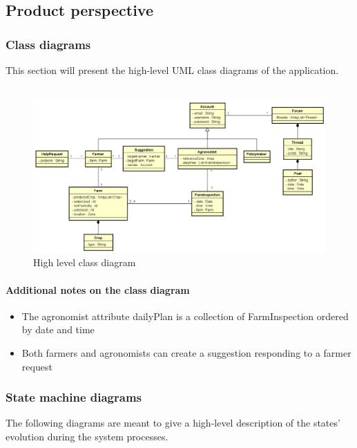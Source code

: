 \subsection{Product perspective}
\subsubsection{Class diagrams}
This section will present the high-level UML class diagrams of the application.
\\\\
\begin{figure}[H]
    \centering
    \includegraphics[width=\textwidth,height=\textheight,keepaspectratio]{Images/HighLevelUMLcut.png}
    \caption{\label{fig:high_level_uml}High level class diagram}
\end{figure}

\bigskip
\paragraph{Additional notes on the class diagram}
\begin{itemize}
    \item The agronomist attribute dailyPlan is a collection of FarmInspection ordered by date and time
    \item Both farmers and agronomists can create a suggestion responding to a farmer request
\end{itemize}

\newpage
\subsubsection{State machine diagrams}
The following diagrams are meant to give a high-level description of the states' evolution during the system processes.
\\\\

